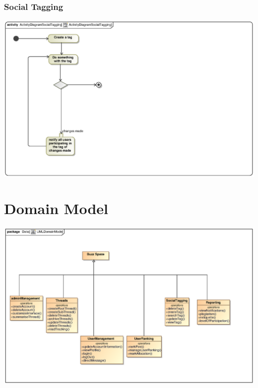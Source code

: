 \documentclass[hidelinks, 12pt, oneside]{article}
\begin{document}
\subsubsection{Social Tagging}
\includegraphics[scale=.9]{Semaka/graphics/activityDiagramSocialTagging.eps}\\
\section{Domain Model} 
\includegraphics[scale=.9]{Kgomotso/graphics/UMLDomainModel.eps}\\
\end{document}
